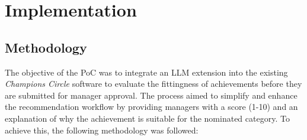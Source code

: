 \chapter{Implementation}
\label{implementation}

\section{Methodology}
The objective of the \ac{PoC} was to integrate an \ac{LLM} extension into the existing \textit{Champions Circle} software to evaluate the fittingness of achievements 
before they are submitted for manager approval. The process aimed to simplify and enhance the recommendation workflow by providing managers with a score (1-10) and an 
explanation of why the achievement is suitable for the nominated category. To achieve this, the following methodology was followed:

